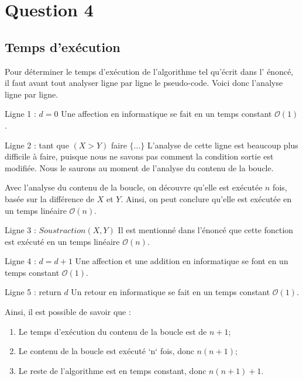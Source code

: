 \documentclass[12pt]{article}
\begin{document}
  \newpage

  \section*{Question 4}
	\subsection*{Temps d'exécution}
    Pour déterminer le temps d'exécution de l'algorithme tel qu'écrit dans l'
    énoncé, il faut avant tout analyser ligne par ligne le pseudo-code. Voici
    donc l'analyse ligne par ligne. \newline

    Ligne 1 : \( d = 0 \) \newline
    Une affection en informatique se fait en un temps constant
    \( \mathcal{O}(1) \). \newline

    Ligne 2 : tant que \( (X > Y) \) faire \( \{ ... \} \) \newline
    L'analyse de cette ligne est beaucoup plus difficile à faire, puisque nous
	  ne savons pas comment la condition sortie est modifiée. Nous le saurons au
    moment de l'analyse du contenu de la boucle. \newline

  	Avec l'analyse du contenu de la boucle, on découvre qu'elle est exécutée
  	\( n \) fois, basée sur la différence de \( X \) et \( Y \). Ainsi, on peut
    conclure qu'elle est exécutée en un temps linéaire \( \mathcal{O}(n) \).
    \newline

    Ligne 3 : \( Soustraction(X, Y) \) \newline
    Il est mentionné dans l'énoncé que cette fonction est exécuté en un temps
	  linéaire \( \mathcal{O}(n) \). \newline

    Ligne 4 : \( d = d + 1 \) \newline
    Une affection et une addition en informatique se font en un temps constant
    \( \mathcal{O}(1) \). \newline

    Ligne 5 : return \( d \) \newline
  	Un retour en informatique se fait en un temps constant
    \( \mathcal{O}(1) \). \newline

    \noindent Ainsi, il est possible de savoir que :
    \begin{enumerate}
      \item Le temps d'exécution du contenu de la boucle est de \( n + 1 \);
      \item Le contenu de la boucle est exécuté `n` fois, donc \( n(n + 1) \);
      \item Le reste de l'algorithme est en temps constant, donc
       \( n(n + 1) + 1 \).
    \end{enumerate}
\end{document}
